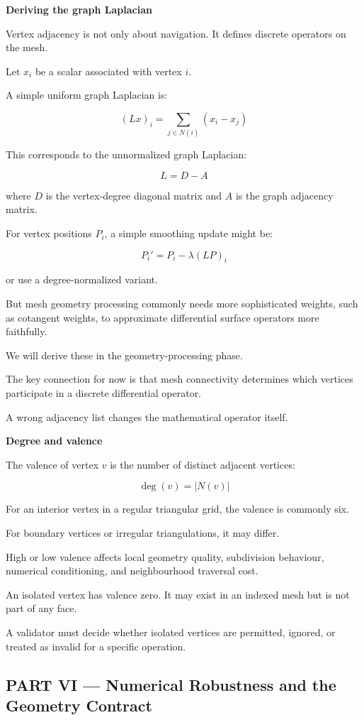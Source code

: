\textbf{Deriving the graph Laplacian}

Vertex adjacency is not only about navigation. It defines discrete operators on the mesh.

Let \(x_i\) be a scalar associated with vertex \(i\).

A simple uniform graph Laplacian is:

\[
\boxed{ (Lx)_i=\sum_{j\in N(i)}(x_i-x_j) }
\]

This corresponds to the unnormalized graph Laplacian:

\[
L=D-A
\]

where \(D\) is the vertex-degree diagonal matrix and \(A\) is the graph adjacency matrix.

For vertex positions \(P_i\), a simple smoothing update might be:

\[
P_i'=P_i-\lambda(LP)_i
\]

or use a degree-normalized variant.

But mesh geometry processing commonly needs more sophisticated weights, such as cotangent weights, to approximate differential surface operators more faithfully.

We will derive these in the geometry-processing phase.

The key connection for now is that mesh connectivity determines which vertices participate in a discrete differential operator.

A wrong adjacency list changes the mathematical operator itself.

\textbf{Degree and valence}

The valence of vertex \(v\) is the number of distinct adjacent vertices:

\[
\boxed{\deg(v)=|N(v)|}
\]

For an interior vertex in a regular triangular grid, the valence is commonly six.

For boundary vertices or irregular triangulations, it may differ.

High or low valence affects local geometry quality, subdivision behaviour, numerical conditioning, and neighbourhood traversal cost.

An isolated vertex has valence zero. It may exist in an indexed mesh but is not part of any face.

A validator must decide whether isolated vertices are permitted, ignored, or treated as invalid for a specific operation.

\subsection{PART VI --- Numerical Robustness and the Geometry Contract}\label{04-visual-computing-ii-ch023-part-vi-numerical-robustness-and-the-geometry-contract}

